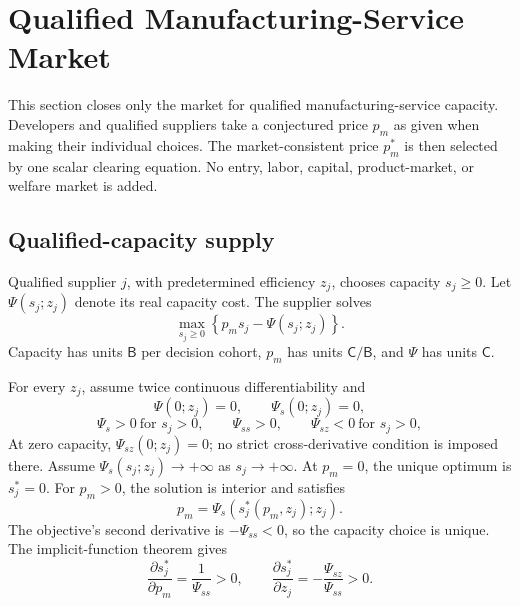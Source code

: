 \section{Qualified Manufacturing-Service Market}
\label{sec:p06-cmo-market}

This section closes only the market for qualified manufacturing-service
capacity. Developers and qualified suppliers take a conjectured price \(p_m\)
as given when making their individual choices. The market-consistent price
\(p_m^*\) is then selected by one scalar clearing equation. No entry, labor,
capital, product-market, or welfare market is added.

\subsection{Qualified-capacity supply}
\label{subsec:p06-supply}

Qualified supplier \(j\), with predetermined efficiency \(z_j\), chooses
capacity \(s_j\geq0\). Let \(\Psi(s_j;z_j)\) denote its real
capacity cost. The supplier solves
\begin{equation}
  \max_{s_j\geq0}
  \left\{
    p_ms_j-\Psi(s_j;z_j)
  \right\}.
  \label{eq:p06-supplier-problem}
\end{equation}
Capacity has units \(\mathsf B\) per decision cohort, \(p_m\) has units
\(\mathsf C/\mathsf B\), and \(\Psi\) has units \(\mathsf C\).

For every \(z_j\), assume twice continuous differentiability and
\[
  \Psi(0;z_j)=0,\qquad \Psi_s(0;z_j)=0,
\]
\[
  \Psi_s>0\ \text{for }s_j>0,\qquad
  \Psi_{ss}>0,\qquad
  \Psi_{sz}<0\ \text{for }s_j>0,
\]
At zero capacity, \(\Psi_{sz}(0;z_j)=0\); no strict cross-derivative
condition is imposed there. Assume \(\Psi_s(s_j;z_j)\to+\infty\) as \(s_j\to+\infty\).
At \(p_m=0\), the unique optimum is \(s_j^*=0\). For \(p_m>0\), the
solution is interior and satisfies
\begin{equation}
  p_m=\Psi_s\!\left(s_j^*(p_m,z_j);z_j\right).
  \label{eq:p06-supplier-capacity}
\end{equation}
The objective's second derivative is
\(-\Psi_{ss}<0\), so the capacity choice is unique. The
implicit-function theorem gives
\begin{equation}
  \frac{\partial s_j^*}{\partial p_m}
  =
  \frac{1}{\Psi_{ss}}>0,
  \qquad
  \frac{\partial s_j^*}{\partial z_j}
  =
  -\frac{\Psi_{sz}}{\Psi_{ss}}>0.
  \label{eq:p06-capacity-derivatives}
\end{equation}

